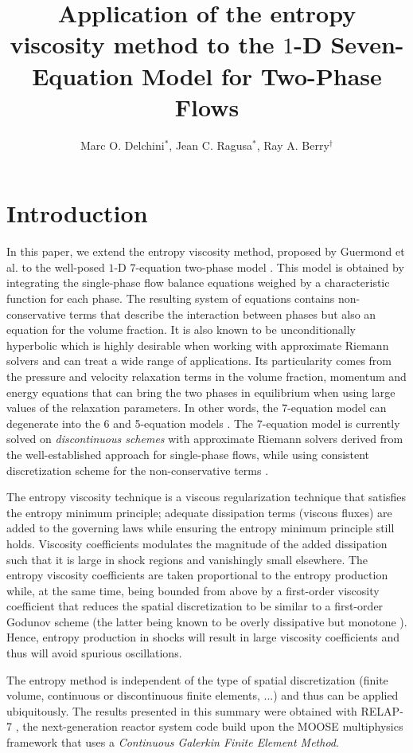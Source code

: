 \documentclass{anstrans}
\title{Application of the entropy viscosity method to the $1$-D Seven-Equation Model for Two-Phase Flows}
\author{Marc O. Delchini$^{*}$, Jean C. Ragusa$^{*}$, Ray A. Berry$^\dagger$}
\institute{
$^{*}$Department of Nuclear Engineering, Texas A\&M University, 
$^\dagger$Idaho National Laboratory
}
\begin{document}
\section{Introduction}
%
In this paper, we extend the entropy viscosity method, proposed by Guermond et al. \cite{jlg1, jlg2}
to the well-posed $1$-D 7-equation two-phase model \cite{DEM, berry}. This model is obtained by integrating the single-phase flow balance equations weighed by a characteristic function for each phase. The resulting system of equations contains non-conservative terms that describe the interaction between phases but also an equation for the volume fraction. It is also known to be unconditionally hyperbolic which is highly desirable when working with approximate Riemann solvers and can treat a wide range of applications. Its particularity comes from the pressure and velocity relaxation terms in the volume fraction, momentum and energy equations that can bring the two phases in equilibrium when using large values of the relaxation parameters. In other words, the 7-equation model can degenerate into the 6 \cite{Toumi_1996} and 5-equation models \cite{Kapila_2001}. The 7-equation model is currently solved on \emph{discontinuous schemes} with approximate Riemann solvers derived from the well-established approach for single-phase flows, while using consistent discretization scheme for the non-conservative terms \cite{Saurel_2001a, Saurel_2001b, Li_2004, Zein_2010, Ambroso_2012}. 

The entropy viscosity technique is a viscous regularization technique
that satisfies the entropy minimum principle; adequate dissipation terms (viscous fluxes)
are added to the governing laws while ensuring the entropy minimum principle still holds.
Viscosity coefficients modulates the magnitude of the added dissipation such that it is
large in shock regions and vanishingly small elsewhere. The entropy viscosity coefficients
are taken proportional to the entropy production while, at the same time, being bounded
from above by a first-order viscosity coefficient that reduces the spatial discretization
to be similar to a first-order Godunov scheme (the latter being known to be overly dissipative but
monotone \cite{toro}). Hence, entropy production in shocks will result in large viscosity  
coefficients and thus will avoid spurious oscillations. 

The entropy method is independent of the type of spatial discretization (finite volume,
continuous or discontinuous finite elements, ...) and thus can be applied ubiquitously. 
The results presented in this summary were obtained with RELAP-7 \cite{Berry_2014}, the next-generation 
reactor system code build upon the MOOSE multiphysics framework
\cite{moose} that uses a \emph{Continuous Galerkin Finite Element Method}.
\end{document}
